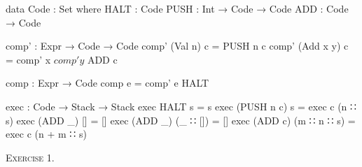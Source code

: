 \documentclass{article}
\begin{document}
\begin{code}
  data Code : Set where
    HALT : Code
    PUSH : Int → Code → Code
    ADD : Code → Code
\end{code}
\begin{code}
  comp' : Expr → Code → Code
  comp' (Val n) c = PUSH n c
  comp' (Add x y) c = comp' x $ comp' y $ ADD c
\end{code}
\begin{code}
  comp : Expr → Code
  comp e = comp' e HALT
\end{code}
\begin{code}
  exec : Code → Stack → Stack
  exec HALT s = s
  exec (PUSH n c) s = exec c (n ∷ s)
  exec (ADD _) [] = []
  exec (ADD _) (_ ∷ []) = []
  exec (ADD c) (m ∷ n ∷ s) = exec c (n + m ∷ s)
\end{code}

\textsc{Exercise 1}.

\end{document}

